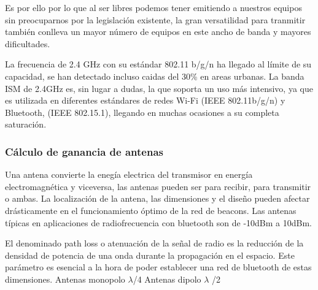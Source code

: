 \documentclass[a4paper ,12pt, onecolumn]{article}
\begin{document}
\begin{itemize}
                Es por ello por lo que al ser libres podemos tener emitiendo a nuestros equipos sin preocuparnos por
                la legislación existente, la gran versatilidad para tranmitir también conlleva un mayor número de equipos 
                en este ancho de banda y mayores dificultades.
            \end{itemize}
            La frecuencia de 2.4 GHz con su estándar 802.11 b/g/n ha llegado al límite de su capacidad, se han
            detectado incluso caidas del 30\% en areas urbanas.  
            La banda ISM de 2.4GHz es, sin lugar a dudas, la que soporta un uso más intensivo, ya que es utilizada en 
            diferentes estándares de redes Wi-Fi (IEEE 802.11b/g/n) y Bluetooth, (IEEE 802.15.1), llegando en muchas 
            ocasiones a su completa saturación.
        \subsubsection{Cálculo de ganancia de antenas}
            Una antena convierte la enegía electrica del transmisor en energía electromagnética y viceversa, las antenas pueden ser 
            para recibir, para transmitir o ambas. La localización de la antena, las dimensiones y el diseño pueden afectar drásticamente
            en el funcionamiento óptimo de la red de beacons. 
            Las antenas típicas en aplicaciones de radiofrecuencia con bluetooth son de -10dBm a 10dBm.

            El denominado path loss o atenuación de la señal de radio es la reducción de la densidad de potencia de una onda durante la 
            propagación en el espacio. Este parámetro es esencial a la hora de poder establecer una red de bluetooth de estas dimensiones.
            Antenas monopolo $\lambda$/4
            Antenas dipolo $\lambda$ /2 
\end{document}
